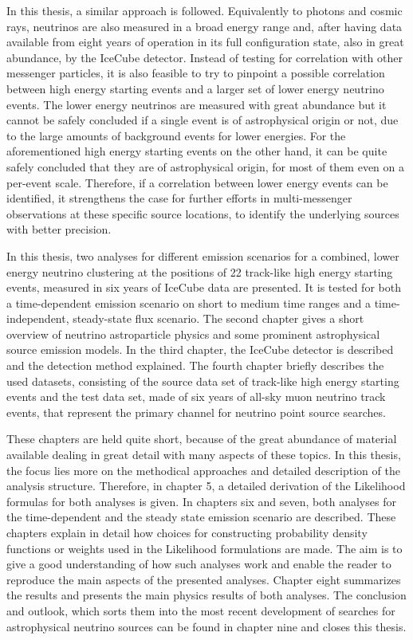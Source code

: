 In this thesis, a similar approach is followed.
Equivalently to photons and cosmic rays, neutrinos are also measured in a broad energy range and, after having data available from eight years of operation in its full configuration state, also in great abundance, by the IceCube detector.
Instead of testing for correlation with other messenger particles, it is also feasible to try to pinpoint a possible correlation between high energy starting events and a larger set of lower energy neutrino events.
The lower energy neutrinos are measured with great abundance but it cannot be safely concluded if a single event is of astrophysical origin or not, due to the large amounts of background events for lower energies.
For the aforementioned high energy starting events on the other hand, it can be quite safely concluded that they are of astrophysical origin, for most of them even on a per-event scale.
Therefore, if a correlation between lower energy events can be identified, it strengthens the case for further efforts in multi-messenger observations at these specific source locations, to identify the underlying sources with better precision.

In this thesis, two analyses for different emission scenarios for a combined, lower energy neutrino clustering at the positions of 22 track-like high energy starting events, measured in six years of IceCube data are presented.
It is tested for both a time-dependent emission scenario on short to medium time ranges and a time-independent, steady-state flux scenario.
The second chapter gives a short overview of neutrino astroparticle physics and some prominent astrophysical source emission models.
In the third chapter, the IceCube detector is described and the detection method explained.
The fourth chapter briefly describes the used datasets, consisting of the source data set of track-like high energy starting events and the test data set, made of six years of all-sky muon neutrino track events, that represent the primary channel for neutrino point source searches.

These chapters are held quite short, because of the great abundance of material available dealing in great detail with many aspects of these topics.
In this thesis, the focus lies more on the methodical approaches and detailed description of the analysis structure.
Therefore, in chapter 5, a detailed derivation of the Likelihood formulas for both analyses is given.
In chapters six and seven, both analyses for the time-dependent and the steady state emission scenario are described.
These chapters explain in detail how choices for constructing probability density functions or weights used in the Likelihood formulations are made.
The aim is to give a good understanding of how such analyses work and enable the reader to reproduce the main aspects of the presented analyses.
Chapter eight summarizes the results and presents the main physics results of both analyses.
The conclusion and outlook, which sorts them into the most recent development of searches for astrophysical neutrino sources can be found in chapter nine and closes this thesis.
